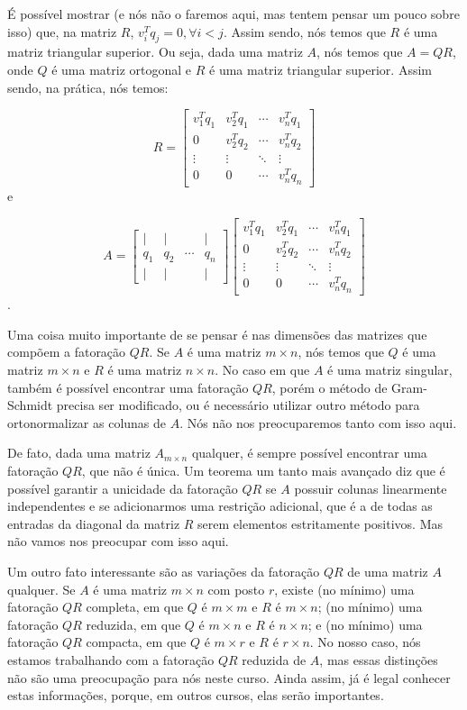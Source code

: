 É possível mostrar (e nós não o faremos aqui, mas tentem pensar um pouco sobre isso) que, na matriz $R$, $v_i^Tq_j = 0, \forall i < j$. Assim sendo, nós temos que $R$ é uma matriz triangular superior. Ou seja, dada uma matriz $A$, nós temos que $A = QR$, onde $Q$ é uma matriz ortogonal e $R$ é uma matriz triangular superior. Assim sendo, na prática, nós temos:

$$
R = \begin{bmatrix}
	v_1^Tq_1 & v_2^Tq_1 & \cdots & v_n^Tq_1 \\
	0 & v_2^Tq_2 & \cdots & v_n^Tq_2 \\
	\vdots & \vdots & \ddots & \vdots \\
	0 & 0 & \cdots & v_n^Tq_n
\end{bmatrix}
$$
e

$$
A = \begin{bmatrix}
	| & | & & | \\
	q_1 & q_2 & \cdots & q_n \\
	| & | & & |
\end{bmatrix}\begin{bmatrix}
	v_1^Tq_1 & v_2^Tq_1 & \cdots & v_n^Tq_1 \\
	0 & v_2^Tq_2 & \cdots & v_n^Tq_2 \\
	\vdots & \vdots & \ddots & \vdots \\
	0 & 0 & \cdots & v_n^Tq_n
\end{bmatrix}
$$.

Uma coisa muito importante de se pensar é nas dimensões das matrizes que compõem a fatoração $QR$. Se $A$ é uma matriz $m\times n$, nós temos que $Q$ é uma matriz $m\times n$ e $R$ é uma matriz $n\times n$. No caso em que $A$ é uma matriz singular, também é possível encontrar uma fatoração $QR$, porém o método de Gram-Schmidt precisa ser modificado, ou é necessário utilizar outro método para ortonormalizar as colunas de $A$. Nós não nos preocuparemos tanto com isso aqui.

De fato, dada uma matriz $A_{m\times n}$ qualquer, é sempre possível encontrar uma fatoração $QR$, que não é única. Um teorema um tanto mais avançado diz que é possível garantir a unicidade da fatoração $QR$ se $A$ possuir colunas linearmente independentes e se adicionarmos uma restrição adicional, que é a de todas as entradas da diagonal da matriz $R$ serem elementos estritamente positivos. Mas não vamos nos preocupar com isso aqui.

Um outro fato interessante são as variações da fatoração $QR$ de uma matriz $A$ qualquer. Se $A$ é uma matriz $m\times n$ com posto $r$, existe (no mínimo) uma fatoração $QR$ completa, em que $Q$ é $m\times m$ e $R$ é $m\times n$; (no mínimo) uma fatoração $QR$ reduzida, em que $Q$ é $m\times n$ e $R$ é $n\times n$; e (no mínimo) uma fatoração $QR$ compacta, em que $Q$ é $m\times r$ e $R$ é $r\times n$. No nosso caso, nós estamos trabalhando com a fatoração $QR$ reduzida de $A$, mas essas distinções não são uma preocupação para nós neste curso. Ainda assim, já é legal conhecer estas informações, porque, em outros cursos, elas serão importantes.

